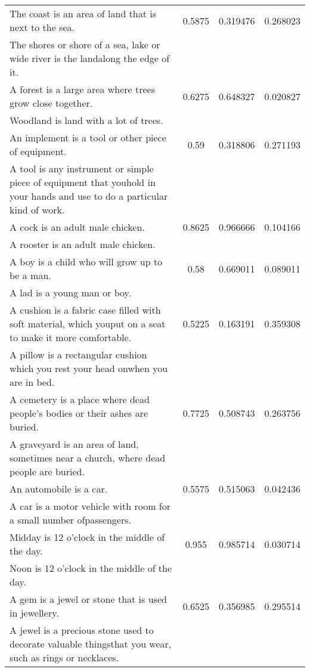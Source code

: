 \begin{table}[p]
\begin{center}
{\begin{tabular}{|p{9cm}|c|c|c|}
\hline
The coast is an area of land that is next to the sea. & 0.5875 & 0.319476 & 0.268023 \\
The shores or shore of a sea, lake or wide river is the landalong the edge of it. & & & \\
\hline
A forest is a large area where trees grow close together. & 0.6275 & 0.648327 & 0.020827 \\
Woodland is land with a lot of trees. & & & \\
\hline
An implement is a tool or other piece of equipment. & 0.59 & 0.318806 & 0.271193 \\
A tool is any instrument or simple piece of equipment that youhold in your hands and use to do a particular kind of work. & & & \\
\hline
A cock is an adult male chicken. & 0.8625 & 0.966666 & 0.104166 \\
A rooster is an adult male chicken. & & & \\
\hline
A boy is a child who will grow up to be a man. & 0.58 & 0.669011 & 0.089011 \\
A lad is a young man or boy. & & & \\
\hline
A cushion is a fabric case filled with soft material, which youput on a seat to make it more comfortable. & 0.5225 & 0.163191 & 0.359308 \\
A pillow is a rectangular cushion which you rest your head onwhen you are in bed. & & & \\
\hline
A cemetery is a place where dead people's bodies or their ashes are buried. & 0.7725 & 0.508743 & 0.263756 \\
A graveyard is an area of land, sometimes near a church, where dead people are buried. & & & \\
\hline
An automobile is a car. & 0.5575 & 0.515063 & 0.042436 \\
A car is a motor vehicle with room for a small number ofpassengers. & & & \\
\hline
Midday is 12 o'clock in the middle of the day. & 0.955 & 0.985714 & 0.030714 \\
Noon is 12 o'clock in the middle of the day. & & & \\
\hline
A gem is a jewel or stone that is used in jewellery. & 0.6525 & 0.356985 & 0.295514 \\
A jewel is a precious stone used to decorate valuable thingsthat you wear, such as rings or necklaces. & & & \\
\hline
\end{tabular}
}
\end{center}
\end{table}

